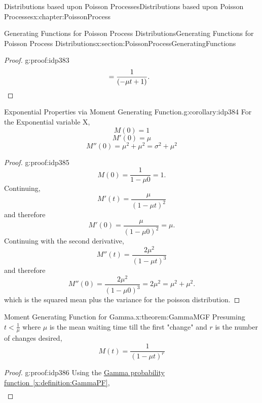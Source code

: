 \documentclass[oneside,10pt,]{book}
\newcommand{\xreffont}{\relax}
\newcommand{\qedhere}{\relax}
\numberwithin{equation}{section}
\newcommand{\lt}{<}
\begin{document}
\begin{chapterptx}{Distributions based upon Poisson Processes}{}{Distributions based upon Poisson Processes}{}{}{x:chapter:PoissonProcess}
\begin{sectionptx}{Generating Functions for Poisson Process Distributions}{}{Generating Functions for Poisson Process Distributions}{}{}{x:section:PoissonProcessGeneratingFunctions}
\begin{proof}{}{g:proof:idp383}
\begin{align*}
& =  \frac{1}{\left(-\mu t + 1 \right )}.\qedhere
\end{align*}
%
\end{proof}
\begin{corollary}{Exponential Properties via Moment Generating Function.}{}{g:corollary:idp384}%
For the Exponential variable X,%
\begin{equation*}
M(0) = 1
\end{equation*}
%
\begin{equation*}
M'(0) = \mu
\end{equation*}
%
\begin{equation*}
M''(0) = \mu^2 + \mu^2 = \sigma^2 + \mu^2
\end{equation*}
%
\end{corollary}
\begin{proof}{}{g:proof:idp385}
%
\begin{equation*}
M(0) = \frac{1}{1-\mu 0} = 1.
\end{equation*}
Continuing,%
\begin{equation*}
M'(t) = \frac{\mu}{ \left ( 1-\mu t \right )^2}
\end{equation*}
and therefore%
\begin{equation*}
M'(0) = \frac{\mu}{ \left ( 1-\mu 0 \right )^2} = \mu.
\end{equation*}
Continuing with the second derivative,%
\begin{equation*}
M''(t) = \frac{2 \mu^2}{ \left ( 1-\mu t \right )^3}
\end{equation*}
and therefore%
\begin{equation*}
M''(0) = \frac{2 \mu^2}{ \left ( 1-\mu 0 \right )^3}= 2 \mu^2 = \mu^2 + \mu^2. 
\end{equation*}
which is the squared mean plus the variance for the poisson distribution.%
\end{proof}
\begin{theorem}{Moment Generating Function for Gamma.}{}{x:theorem:GammaMGF}%
Presuming \(t \lt \frac{1}{\mu}\) where \(\mu\) is the mean waiting time till the first "change" and \(r\) is the number of changes desired,%
\begin{equation*}
M(t) = \frac{1}{ \left ( 1-\mu t \right )^{r}}
\end{equation*}
%
\end{theorem}
\begin{proof}{}{g:proof:idp386}
Using the \hyperref[x:definition:GammaPF]{Gamma probability function~{\xreffont\ref{x:definition:GammaPF}}},%
\begin{align*}

\end{align*}
\end{proof}
\end{sectionptx}
\end{chapterptx}
\end{document}
